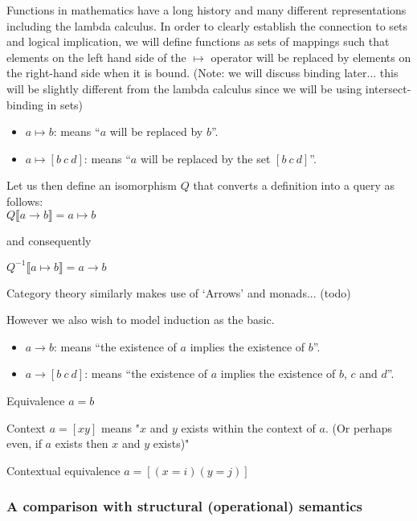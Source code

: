 \documentclass[11pt]{article}
\begin{document}
Functions in mathematics have a long history and many different representations including the lambda calculus.
In order to clearly establish the connection to sets and logical implication, we will define functions as sets of mappings such that elements on the left hand side of the 
$\mapsto$ operator will be replaced by elements on the right-hand side when it is bound. (Note: we will discuss binding later... this will be slightly different from the lambda calculus since we will be using intersect-binding in sets)

\begin{itemize}
\item $a \mapsto b$: means ``$a$ will be replaced by $b$''. 
\item $a \mapsto [b\ c\ d]$: means ``$a$ will be replaced by the set $[b\ c\ d]$''. 
\end{itemize}

Let us then define an isomorphism $Q$ that converts a definition into a query as follows:\\

$Q\llbracket a \rightarrow b \rrbracket = a \mapsto b$

and consequently

$Q^{-1}\llbracket a \mapsto b\rrbracket = a \rightarrow b$


Category theory similarly makes use of `Arrows' and monads... (todo)


However we also wish to model induction as the basic.

\begin{itemize}
\item $a \rightarrow b$: means ``the existence of $a$ implies the existence of $b$''.
\item $a \rightarrow [b\ c\ d]$: means ``the existence of $a$ implies the existence of $b$, $c$ and $d$''.
\end{itemize}

Equivalence
$a = b$

Context
$a = [x y]$ means "$x$ and $y$ exists within the context of $a$. (Or perhaps even, if $a$ exists then $x$ and $y$ exists)"

Contextual equivalence
$a = [(x = i) (y = j)]$

\subsubsection{ A comparison with structural (operational) semantics }

\end{document}
